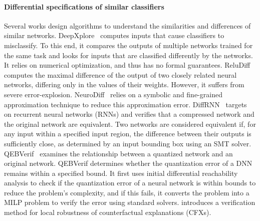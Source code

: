 \paragraph{Differential specifications of similar classifiers}
Several works design algorithms to understand the similarities and differences of similar networks.
DeepXplore~\cite{DEEPXPLORE} computes inputs that cause classifiers to misclassify. 
To this end, it compares the outputs of multiple networks trained for the same task and looks for inputs that are classified differently by the networks. It relies on numerical optimization, and thus has no formal guarantees. %
ReluDiff~\cite{RELUDIFF} computes the maximal difference of the output of two closely related neural networks, differing only in the values of their weights. However, it suffers from severe error-explosion. NeuroDiff~\cite{NEURODIFF} relies on a symbolic and fine-grained approximation technique to reduce this approximation error.
DiffRNN~\cite{DIFFRNN} targets on recurrent neural networks (RNNs) and verifies that a compressed network and the original network are equivalent. Two networks are considered equivalent if, for any input within a specified input region, the difference between their outputs is sufficiently close, as determined by an input bounding box using an SMT solver.
QEBVerif~\cite{QEBVERIF} examines the relationship between a quantized network and an original network. QEBVerif determines whether the quantization error of a DNN remains within a specified bound. 
It first uses initial differential reachability analysis to check if the quantization error of a neural network is within bounds to reduce the problem's complexity, and if this fails, it converts the problem into a MILP problem to verify the error using standard solvers.  %
\cite{CFXROBUSTNESS} introduces a verification method for local robustness of counterfactual explanations (CFXs).
